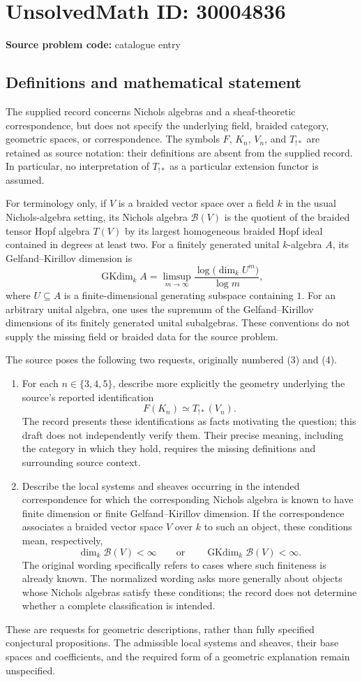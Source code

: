 \documentclass[11pt]{article}
\begin{document}
\section*{UnsolvedMath ID: 30004836}
\textbf{Source problem code:} catalogue entry
\subsection{Definitions and mathematical statement}
The supplied record concerns Nichols algebras and a sheaf-theoretic correspondence, but does not specify the underlying field, braided category, geometric spaces, or correspondence. The symbols \(F\), \(K_n\), \(V_n\), and \(T_{!*}\) are retained as source notation: their definitions are absent from the supplied record. In particular, no interpretation of \(T_{!*}\) as a particular extension functor is assumed.

For terminology only, if \(V\) is a braided vector space over a field \(k\) in the usual Nichols-algebra setting, its Nichols algebra \(\mathcal B(V)\) is the quotient of the braided tensor Hopf algebra \(T(V)\) by its largest homogeneous braided Hopf ideal contained in degrees at least two. For a finitely generated unital \(k\)-algebra \(A\), its Gelfand--Kirillov dimension is
\[
\operatorname{GKdim}_k A
 =\limsup_{m\to\infty}\frac{\log\bigl(\dim_k U^m\bigr)}{\log m},
\]
where \(U\subseteq A\) is a finite-dimensional generating subspace containing \(1\). For an arbitrary unital algebra, one uses the supremum of the Gelfand--Kirillov dimensions of its finitely generated unital subalgebras. These conventions do not supply the missing field or braided data for the source problem.

The source poses the following two requests, originally numbered (3) and (4).
\begin{enumerate}
\item For each \(n\in\{3,4,5\}\), describe more explicitly the geometry underlying the source's reported identification
\[
F(K_n)\simeq T_{!*}(V_n).
\]
The record presents these identifications as facts motivating the question; this draft does not independently verify them. Their precise meaning, including the category in which they hold, requires the missing definitions and surrounding source context.
\item Describe the local systems and sheaves occurring in the intended correspondence for which the corresponding Nichols algebra is known to have finite dimension or finite Gelfand--Kirillov dimension. If the correspondence associates a braided vector space \(V\) over \(k\) to such an object, these conditions mean, respectively,
\[
\dim_k\mathcal B(V)<\infty
\qquad\text{or}\qquad
\operatorname{GKdim}_k\mathcal B(V)<\infty.
\]
The original wording specifically refers to cases where such finiteness is already known. The normalized wording asks more generally about objects whose Nichols algebras satisfy these conditions; the record does not determine whether a complete classification is intended.
\end{enumerate}
These are requests for geometric descriptions, rather than fully specified conjectural propositions. The admissible local systems and sheaves, their base spaces and coefficients, and the required form of a geometric explanation remain unspecified.
\end{document}
